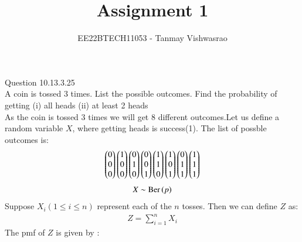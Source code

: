 \documentclass[journal,12pt,twocolumn]{IEEEtran}
\theoremstyle{remark}
\begin{document}
\let\vec\mathbf





\vspace{3cm}

\title{
Assignment 1
}
\author{ EE22BTECH11053 - Tanmay Vishwasrao%
	
}	

\maketitle


\newpage


\bigskip

\renewcommand{\thefigure}{\theenumi}
\renewcommand{\thetable}{\theenumi}
Question 10.13.3.25\\
A coin is tossed 3 times. List the possible outcomes. Find the probability of getting
(i) all heads (ii) at least 2 heads\\
\solution
As the coin is tossed 3 times we will get 8 different outcomes.Let us define a random variable $X$, where getting heads is success(1). The list of possble outcomes is:
\begin{align}
\begin{pmatrix}0 \\ 0 \\ 0\end{pmatrix} \begin{pmatrix}1 \\ 0 \\ 0\end{pmatrix} \begin{pmatrix}0 \\ 1 \\ 0\end{pmatrix} \begin{pmatrix}0 \\ 0 \\ 1\end{pmatrix} \begin{pmatrix}1 \\ 1 \\ 0\end{pmatrix} \begin{pmatrix}1 \\ 0 \\ 1\end{pmatrix} \begin{pmatrix}0 \\ 1 \\ 1\end{pmatrix} \begin{pmatrix}1 \\ 1 \\ 1\end{pmatrix}   
\end{align}
\begin{align}
X \sim \text{Ber}\left(p\right)\\
\end{align}
Suppose $X_i (1 \leq i \leq n)$ represent each of the $n$ tosses. Then we can define $Z$ as:
\begin{align}
Z = \sum_{i=1}^nX_i
\end{align}
The pmf of $Z$ is given by : 
\end{document}
